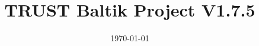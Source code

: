 \documentclass[10pt, hyperref={unicode=true,pdfusetitle, bookmarks=true,bookmarksnumbered=false,bookmarksopen=false, breaklinks=false,pdfborder={0 0 1},backref=true,colorlinks=true,linkcolor=darkblue,pageanchor, urlcolor=darkblue}]{beamer}
\title[TRUST Baltik Project V1.7.5]{TRUST Baltik Project V1.7.5}
\institute[CEA/DEN/DANS/DM2S/STMF] %
{
CEA Saclay \\ %
\medskip
\textit{triou@cea.fr} %
}
\date{\today} %
\begin{document}
\begin{frame}
\titlepage %
\end{frame}

\begin{frame}
\tableofcontents [hideallsubsections]
\end{frame}
\end{document}
